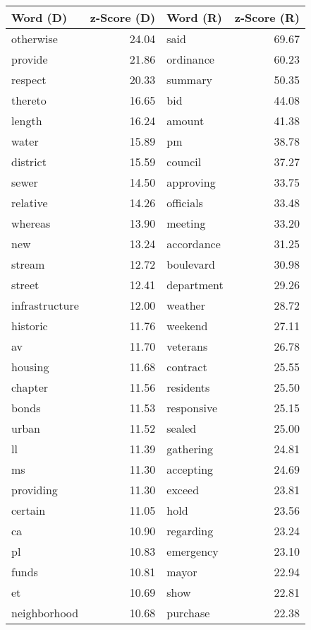 \begin{table}[ht]
\centering
\begingroup\fontsize{9pt}{10pt}\selectfont
\begin{tabular}{lrlr}
  \hline
Word (D) & z-Score (D) & Word (R) & z-Score (R) \\ 
  \hline
otherwise & 24.04 & said & 69.67 \\ 
  provide & 21.86 & ordinance & 60.23 \\ 
  respect & 20.33 & summary & 50.35 \\ 
  thereto & 16.65 & bid & 44.08 \\ 
  length & 16.24 & amount & 41.38 \\ 
  water & 15.89 & pm & 38.78 \\ 
  district & 15.59 & council & 37.27 \\ 
  sewer & 14.50 & approving & 33.75 \\ 
  relative & 14.26 & officials & 33.48 \\ 
  whereas & 13.90 & meeting & 33.20 \\ 
  new & 13.24 & accordance & 31.25 \\ 
  stream & 12.72 & boulevard & 30.98 \\ 
  street & 12.41 & department & 29.26 \\ 
  infrastructure & 12.00 & weather & 28.72 \\ 
  historic & 11.76 & weekend & 27.11 \\ 
  av & 11.70 & veterans & 26.78 \\ 
  housing & 11.68 & contract & 25.55 \\ 
  chapter & 11.56 & residents & 25.50 \\ 
  bonds & 11.53 & responsive & 25.15 \\ 
  urban & 11.52 & sealed & 25.00 \\ 
  ll & 11.39 & gathering & 24.81 \\ 
  ms & 11.30 & accepting & 24.69 \\ 
  providing & 11.30 & exceed & 23.81 \\ 
  certain & 11.05 & hold & 23.56 \\ 
  ca & 10.90 & regarding & 23.24 \\ 
  pl & 10.83 & emergency & 23.10 \\ 
  funds & 10.81 & mayor & 22.94 \\ 
  et & 10.69 & show & 22.81 \\ 
  neighborhood & 10.68 & purchase & 22.38 \\ 

\end{tabular}
\end{table}
